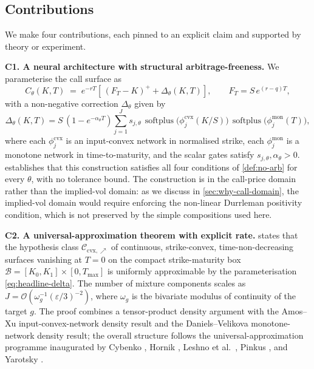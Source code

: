 \documentclass[largeformat]{interact}
\let\cite\citep   %
\theoremstyle{plain}
\theoremstyle{definition}
\DeclareMathOperator{\softplus}{softplus}
\newcommand{\eps}{\varepsilon}
\begin{document}
\subsection{Contributions}
\label{sec:contributions}

We make four contributions, each pinned to an explicit claim and supported by theory or experiment.

\smallskip\noindent\textbf{C1. A neural architecture with structural arbitrage-freeness.}
We parameterise the call surface as
\begin{equation}
\label{eq:headline}
C_\theta(K, T) \;=\; e^{-rT}\!\left[\,(F_T - K)^+ + \Delta_\theta(K, T)\right], \qquad F_T = S\,e^{(r-q)T},
\end{equation}
with a non-negative correction $\Delta_\theta$ given by
\begin{equation}
\label{eq:headline-delta}
\Delta_\theta(K, T) = S\,(1 - e^{-\alpha_\theta T}) \sum_{j=1}^{J} s_{j,\theta}\, \softplus\!\bigl(\phi^{\mathrm{cvx}}_j(K/S)\bigr)\,\softplus\!\bigl(\phi^{\mathrm{mon}}_j(T)\bigr),
\end{equation}
where each $\phi^{\mathrm{cvx}}_j$ is an input-convex network \cite{amos2017input,bunne2022supervised,chen2018optimal} in normalised strike, each $\phi^{\mathrm{mon}}_j$ is a monotone network \cite{daniels2010monotone,sill1998monotonic,wehenkel2019unconstrained,runje2023constrained,guo2021neural} in time-to-maturity, and the scalar gates satisfy $s_{j,\theta}, \alpha_\theta > 0$.  establishes that this construction satisfies all four conditions of \cref{def:no-arb} for every $\theta$, with no tolerance bound. The construction is in the call-price domain rather than the implied-vol domain: as we discuss in \cref{sec:why-call-domain}, the implied-vol domain would require enforcing the non-linear Durrleman positivity condition, which is not preserved by the simple compositions used here.

\smallskip\noindent\textbf{C2. A universal-approximation theorem with explicit rate.}
 states that the hypothesis class
$\mathcal{C}_{\mathrm{cvx},\nearrow}$
of continuous, strike-convex, time-non-decreasing surfaces vanishing at $T = 0$ on the compact strike-maturity box $\mathcal{B} = [K_0, K_1] \times [0, T_{\max}]$ is uniformly approximable by the parameterisation \cref{eq:headline-delta}. The number of mixture components scales as $J = \mathcal{O}(\omega_g^{-1}(\eps/3)^{-2})$, where $\omega_g$ is the bivariate modulus of continuity of the target $g$. The proof combines a tensor-product density argument with the Amos--Xu \citeyearpar{amos2017input} input-convex-network density result and the Daniels--Velikova \citeyearpar{daniels2010monotone} monotone-network density result; the overall structure follows the universal-approximation programme inaugurated by Cybenko \citeyearpar{cybenko1989approximation}, Hornik \citeyearpar{hornik1989multilayer,hornik1991approximation}, Leshno et al.\ \citeyearpar{leshno1993multilayer}, Pinkus \citeyearpar{pinkus1999approximation}, and Yarotsky \citeyearpar{yarotsky2017error}.
\end{document}
